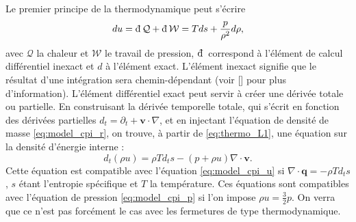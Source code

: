 Le premier principe de la thermodynamique peut s'écrire 
\begin{equation}
\label{eq:thermo_L1} du =  \dj \mathcal{Q} + \dj \mathcal{W} = Tds + \frac{p}{\rho^2} d\rho,
\end{equation}
avec $\mathcal{Q}$ la chaleur et $\mathcal{W}$ le travail de pression, $\dj$ correspond à l'élément de calcul différentiel inexact et $d$ à l'élément exact. L'élément inexact signifie que le résultat d'une intégration sera chemin-dépendant (voir [\cite{borel_thermodynamique_2005}] pour plus d'information). L'élément différentiel exact peut servir à créer une dérivée totale ou partielle. En construisant la dérivée temporelle totale, qui s'écrit en fonction des dérivées partielles $d_t = \partial_t + \boldsymbol{v} \cdot \nabla $, et en injectant l'équation de densité de masse \eqref{eq:model_cpi_r}, on trouve, à partir de \eqref{eq:thermo_L1}, une équation sur la densité d'énergie interne : 
\begin{equation}
\label{eq:thermo_u}   d_t \left(\rho u\right) = \rho T d_t s - \left(p+\rho u\right)\nabla \cdot \boldsymbol{v}.
\end{equation}
Cette équation est compatible avec l'équation \eqref{eq:model_cpi_u} si $\nabla \cdot \mathbf{q} = - \rho T d_t s$, $s$ étant l'entropie spécifique et $T$ la température. Ces équations sont compatibles avec l'équation de pression \eqref{eq:model_cpi_p} si l'on impose $\rho u = \frac{3}{2} p$. On verra que ce n'est pas forcément le cas avec les fermetures de type thermodynamique. 

